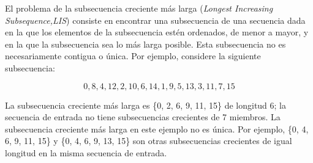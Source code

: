 El problema de la subsecuencia creciente más larga (\emph{Longest Increasing Subsequence,LIS}) consiste en encontrar una subsecuencia de una secuencia dada en la que los elementos de la subsecuencia estén ordenados, de menor a mayor, y en la que la subsecuencia sea lo más larga posible. Esta subsecuencia no es necesariamente contigua o única. Por ejemplo, considere la siguiente subsecuencia:

$${0, 8, 4, 12, 2, 10, 6, 14, 1, 9, 5, 13, 3, 11, 7, 15}$$

La subsecuencia creciente más larga es \{0, 2, 6, 9, 11, 15\} de longitud 6; la secuencia de entrada no tiene subsecuencias crecientes de 7 miembros. La subsecuencia creciente más larga en este ejemplo no es única. Por ejemplo, \{0, 4, 6, 9, 11, 15\} y \{0, 4, 6, 9, 13, 15\} son otras subsecuencias crecientes de igual longitud en la misma secuencia de entrada.